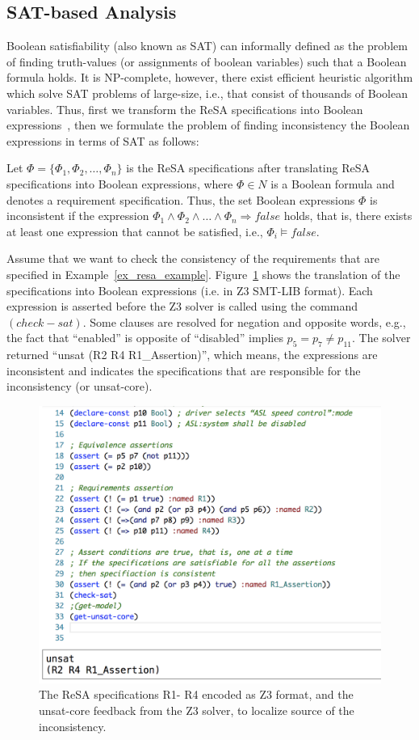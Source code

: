\subsection*{SAT-based Analysis}
Boolean satisfiability (also known as SAT) can informally defined as the problem of finding truth-values (or assignments of boolean variables) such that a Boolean formula holds. It is NP-complete, however, there exist efficient heuristic algorithm which solve SAT problems of large-size, i.e., that consist of thousands of Boolean variables. Thus, first we transform the ReSA specifications into Boolean expressions~\cite{resatool}, then we formulate the problem of finding inconsistency the Boolean expressions in terms of SAT as follows:
\begin{definition}
	Let $\Phi = \{\Phi_1, \Phi_2,\dots,\Phi_n\}$ is the ReSA specifications after translating ReSA specifications into Boolean expressions, where  $\Phi\in N$ is a Boolean formula and denotes a requirement specification. Thus, the set Boolean expressions $\Phi$ is inconsistent if the expression $\Phi_1 \land \Phi_2 \land\dots\land \Phi_n \Rightarrow false$ holds, that is, there exists at least one expression that cannot be satisfied, i.e., $\Phi_i\models false$.
\end{definition}
\begin{example}
Assume that we want to check the consistency of the requirements that are specified in Example~\ref{ex_resa_example}. Figure~\ref{fig_z3} shows the translation of the specifications into Boolean expressions (i.e. in Z3  SMT-LIB format). Each expression is asserted before the Z3 solver is called using the command $(check-sat)$. Some clauses are resolved for negation and opposite words, e.g., the fact that ``enabled'' is opposite of ``disabled'' implies $p_5=p_7\neq p_{11}$. The solver returned ``unsat (R2 R4 R1\_Assertion)'',  which means, the expressions are inconsistent and indicates the specifications that are responsible for the inconsistency (or unsat-core).
\end{example}
\begin{figure}[h]
	\centering
	\includegraphics[width=0.7\linewidth]{images/z3}
	\caption{The ReSA specifications R1- R4 encoded as Z3 format, and the unsat-core feedback from the Z3 solver, to localize source of the inconsistency.}
	\label{fig_z3}
\end{figure}

